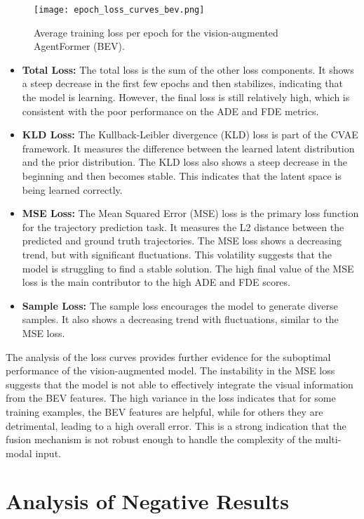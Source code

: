 \begin{figure}[h]
\centering
\texttt{[image: epoch\_loss\_curves\_bev.png]}
\caption{Average training loss per epoch for the vision-augmented AgentFormer (BEV).}
\label{fig:loss_curves_bev}
\end{figure}

\begin{itemize}
    \item \textbf{Total Loss:} The total loss is the sum of the other loss components. It shows a steep decrease in the first few epochs and then stabilizes, indicating that the model is learning. However, the final loss is still relatively high, which is consistent with the poor performance on the ADE and FDE metrics.
    \item \textbf{KLD Loss:} The Kullback-Leibler divergence (KLD) loss is part of the CVAE framework. It measures the difference between the learned latent distribution and the prior distribution. The KLD loss also shows a steep decrease in the beginning and then becomes stable. This indicates that the latent space is being learned correctly.
    \item \textbf{MSE Loss:} The Mean Squared Error (MSE) loss is the primary loss function for the trajectory prediction task. It measures the L2 distance between the predicted and ground truth trajectories. The MSE loss shows a decreasing trend, but with significant fluctuations. This volatility suggests that the model is struggling to find a stable solution. The high final value of the MSE loss is the main contributor to the high ADE and FDE scores.
    \item \textbf{Sample Loss:} The sample loss encourages the model to generate diverse samples. It also shows a decreasing trend with fluctuations, similar to the MSE loss.
\end{itemize}

The analysis of the loss curves provides further evidence for the suboptimal performance of the vision-augmented model. The instability in the MSE loss suggests that the model is not able to effectively integrate the visual information from the BEV features. The high variance in the loss indicates that for some training examples, the BEV features are helpful, while for others they are detrimental, leading to a high overall error. This is a strong indication that the fusion mechanism is not robust enough to handle the complexity of the multi-modal input.

\section{Analysis of Negative Results}

